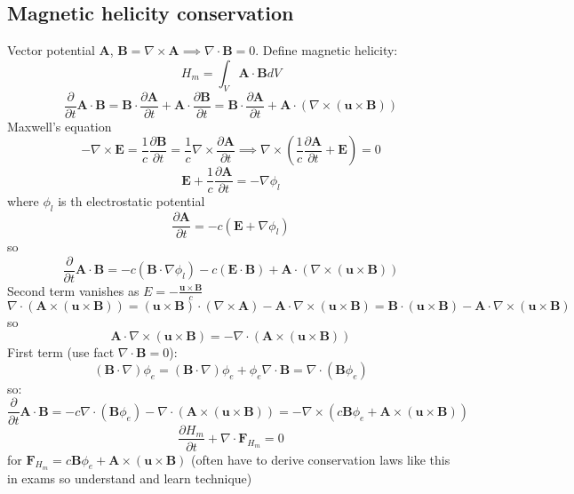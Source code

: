 \documentclass{article}
\begin{document}
\subsection{Magnetic helicity conservation}
Vector potential $\bm A$, $\bm B = \nabla \times \bm A \implies \nabla \cdot \bm B = 0$. Define magnetic helicity:
$$
H_m = \int_V \bm A \cdot \bm B dV
$$
$$
\frac{\partial}{\partial t} \bm A \cdot \bm B = \bm B \cdot \frac{\partial \bm A}{\partial t} + \bm A \cdot \frac{\partial \bm B}{\partial t} = \bm B \cdot \frac{\partial \bm A}{\partial t} + \bm A \cdot ( \nabla \times (\bm u \times \bm B))
$$
Maxwell's equation
$$
- \nabla \times \bm E = \frac{1}{c} \frac{\partial \bm B}{\partial t} = \frac{1}{c} \nabla \times \frac{\partial \bm A}{\partial t} \implies \nabla \times( \frac{1}{c} \frac{\partial \bm A}{\partial t} + \bm E) = 0
$$
$$
\bm E + \frac{1}{c}\frac{\partial \bm A}{\partial t} = - \nabla \phi_l
$$
where $\phi_l$ is th electrostatic potential
$$
\frac{\partial \bm A}{\partial t} = -c(\bm E + \nabla \phi_l)
$$
so 
$$
\frac{\partial }{\partial t} \bm A \cdot \bm B = - c(\bm B \cdot \nabla \phi_l) - c (\bm E \cdot \bm B) + \bm A \cdot (\nabla \times( \bm u \times \bm B))
$$
Second term vanishes as $E = - \frac{\bm u \times \bm B}{c}$ 
$$
\nabla \cdot (\bm A \times (\bm u \times \bm B)) = (\bm u \times \bm B) \cdot (\nabla \times \bm A) - \bm A \cdot \nabla \times (\bm u \times \bm B) = \bm B \cdot (\bm u \times \bm B) - \bm A \cdot \nabla \times (\bm u \times \bm B)
$$
so
$$
\bm A \cdot \nabla \times(\bm u \times \bm B) = - \nabla \cdot (\bm A \times (\bm u \times \bm B))
$$
First term (use fact $\nabla \cdot \bm B = 0$):
$$
(\bm B \cdot \nabla) \phi_e = (\bm B \cdot \nabla) \phi_e + \phi_e \nabla \cdot \bm B = \nabla \cdot(\bm B \phi_e)
$$
so:
$$
\frac{\partial}{\partial t} \bm A \cdot \bm B = - c \nabla \cdot (\bm B \phi_e) - \nabla \cdot (\bm A \times (\bm u \times \bm B)) = - \nabla \times (c \bm B \phi_e + \bm A \times (\bm u \times \bm B))
$$
\begin{equation}
        \frac{\partial H_m}{\partial t} + \nabla \cdot \bm F_{H_m} = 0
\end{equation}
for $\bm F_{H_m} = c \bm B \phi_e + \bm A \times (\bm u \times \bm B)$
(often have to derive conservation laws like this in exams so understand and learn technique)
\end{document}
